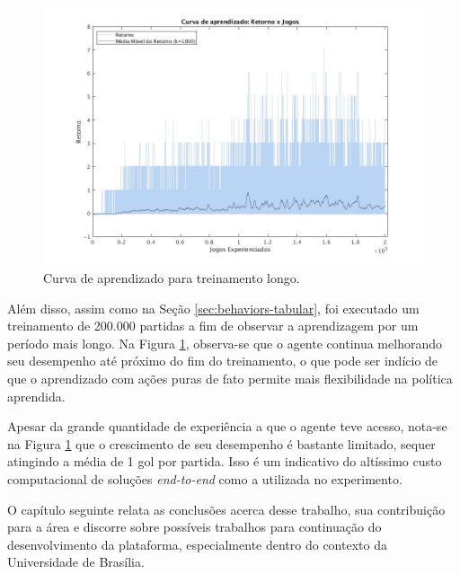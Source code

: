 \begin{figure}[H]
	\includegraphics[width=0.93\linewidth]{figs/curvalonga-qtabular.jpg}
	\centering
	\caption{Curva de aprendizado para treinamento longo.}
	\label{fig:single-agent-curvalonga}
\end{figure}

Além disso, assim como na Seção \ref{sec:behaviors-tabular}, foi executado um treinamento de 200.000 partidas a fim de observar a aprendizagem por um período mais longo. Na Figura \ref{fig:single-agent-curvalonga}, observa-se que o agente continua melhorando seu desempenho até próximo do fim do treinamento, o que pode ser indício de que o aprendizado com ações puras de fato permite mais flexibilidade na política aprendida.

Apesar da grande quantidade de experiência a que o agente teve acesso, nota-se na Figura \ref{fig:single-agent-curvalonga} que o crescimento de seu desempenho é bastante limitado, sequer atingindo a média de 1 gol por partida. Isso é um indicativo do altíssimo custo computacional de soluções \textit{end-to-end} como a utilizada no experimento.

O capítulo seguinte relata as conclusões acerca desse trabalho, sua contribuição para a área e discorre sobre possíveis trabalhos para continuação do desenvolvimento da plataforma, especialmente dentro do contexto da Universidade de Brasília.


 
